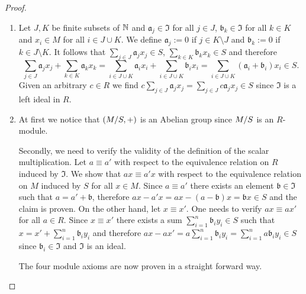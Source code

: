 \begin{proof}
\begin{enumerate}
\item Let $J,K$ be finite subsets of $\N$ and $\mathfrak{a}_j\in \mathfrak{I}$ for all $j\in J$, $\mathfrak{b}_k\in \mathfrak{I}$ for all $k\in K$ and  $x_i\in M$ for all $i\in J\cup K$. We define $\mathfrak{a}_j:=0$ if $j\in K \setminus J$ and $\mathfrak{b}_k:=0$ if $k\in J\setminus K$. It follows that $\sum_{j\in J}\mathfrak{a}_jx_j\in S$, $\sum_{k\in K}\mathfrak{b}_kx_k\in S$ and therefore
\begin{equation*}
\sum_{j\in J}\mathfrak{a}_jx_j+\sum_{k\in K}\mathfrak{a}_kx_k=\sum_{i\in J\cup K} \mathfrak{a}_ix_i+\sum_{i\in J\cup K} \mathfrak{b}_ix_i=\sum_{i\in J\cup K} (\mathfrak{a}_i+\mathfrak{b}_i)x_i\in S.
\end{equation*} 
 Given an arbitrary $c\in R$ we find $c\sum_{j\in J}\mathfrak{a}_jx_j=\sum_{j\in J}c\mathfrak{a}_jx_j\in S$ since $\mathfrak{I}$ is a left ideal in $R$.
\item At first we notice that $(\nicefrac{M}{S}, +)$ is an Abelian group since $\nicefrac{M}{S}$ is an $R$-module.

Secondly, we need to verify the validity of the definition of the scalar multiplication. Let $a\equiv a'$ with respect to the equivalence relation on $R$ induced by $\mathfrak{I}$. We show that $ax\equiv a'x$ with respect to the equivalence relation on $M$ induced by $S$ for all $x\in M$. Since $a\equiv a'$ there exists an element $\mathfrak{b}\in\mathfrak{I}$ such that $a=a'+\mathfrak{b}$, therefore $ax-a'x=ax-(a-\mathfrak{b})x=\mathfrak{b}x\in S$ and the claim is proven. On the other hand, let $x\equiv x'$. One needs to verify $ax\equiv ax'$ for all $a\in R$. Since $x\equiv x'$ there exists a sum $\sum_{i=1}^n\mathfrak{b}_iy_i\in S$ such that $x=x'+\sum_{i=1}^n\mathfrak{b}_iy_i$ and therefore $ax-ax'=a\sum_{i=1}^n\mathfrak{b}_iy_i=\sum_{i=1}^na\mathfrak{b}_iy_i\in S$ since $\mathfrak{b}_i\in\mathfrak{I}$ and $\mathfrak{I}$ is an ideal.

The four module axioms are now proven in a straight forward way.
\end{enumerate}
\end{proof}

